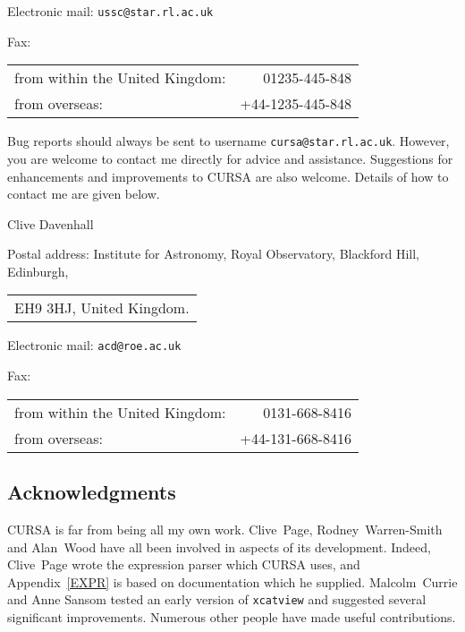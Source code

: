 \documentclass[twoside,11pt]{article}
\renewcommand{\_}{\texttt{\symbol{95}}}
\begin{document}
\vspace{3mm}

Electronic mail: {\tt ussc@star.rl.ac.uk}

\vspace{3mm}

Fax: \\
\begin{tabular}{lr}
from within the United Kingdom: &    01235-445-848 \\
from overseas:                  & +44-1235-445-848 \\
\end{tabular}

\vspace{3mm}

Bug reports should always be sent to username {\tt cursa@star.rl.ac.uk}.
However, you are welcome to contact me directly for advice and assistance.
Suggestions for enhancements and improvements to CURSA are also
welcome.  Details of how to contact me are given below.
\begin{flushright}
Clive Davenhall \\
\end{flushright} 

\vspace{3mm}

Postal address: Institute for Astronomy, Royal Observatory, Blackford Hill,
Edinburgh, \\
\begin{tabular}{l}
EH9 3HJ, United Kingdom.  \\
\end{tabular}

\vspace{4mm}

Electronic mail: {\tt acd@roe.ac.uk}

\vspace{4mm}

Fax: \\
\begin{tabular}{lr}
from within the United Kingdom: &    0131-668-8416 \\
from overseas:                  & +44-131-668-8416 \\
\end{tabular}


\newpage
\subsection*{Acknowledgments}

CURSA is far from being all my own work. Clive~Page, Rodney~Warren-Smith 
and Alan~Wood have all been involved in aspects of its development.
Indeed, Clive~Page wrote the expression parser which CURSA uses, and
Appendix~\ref{EXPR} is based on documentation which he supplied. 
Malcolm~Currie and Anne Sansom tested an early version of {\tt xcatview}
and suggested several significant improvements. Numerous other people have
made useful contributions.
\end{document}
